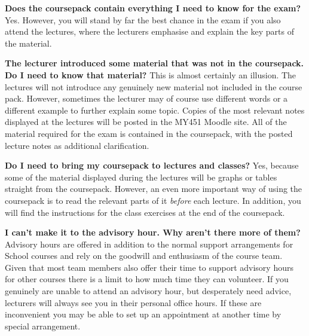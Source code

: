 \textbf{Does the coursepack contain everything I need
to know for the exam?} Yes. However, you will
stand by far the best chance in the exam if you also
attend the lectures, where the lecturers emphasise and explain
the key parts of the material.


\textbf{The lecturer introduced some material
that was not in the coursepack.
Do I need to know that material?}
This is almost certainly an illusion. The lectures will not introduce
any genuinely new material not included in the course pack. However,
sometimes the lecturer may of course use different words or a
different example to further explain some topic.
Copies of the most relevant notes
displayed at the lectures will be posted in the MY451 Moodle site.
All of the material required for the exam is contained in the
coursepack, with the posted lecture notes as additional clarification.



\textbf{Do I need to bring my coursepack to lectures and classes?}
Yes, because some of the material displayed during the lectures will be
graphs or tables straight from the coursepack.
However, an even more important way of using the coursepack is to read
the relevant parts of it \emph{before} each lecture. In addition, you
will find the instructions for the class exercises at the end of the
coursepack.


\textbf{I can't make it to the advisory hour. Why aren't there more of them?}
Advisory hours are offered in addition to the normal support
arrangements for School courses and rely on the goodwill and enthusiasm
of the course team. Given that most team members also offer their time
to support advisory hours for other courses there is a limit to how much
time they can volunteer. If you genuinely are unable to attend an
advisory hour, but desperately need advice, lecturers will always see
you in their personal office hours. If these are inconvenient you may be
able to set up an appointment at another time by special arrangement.

